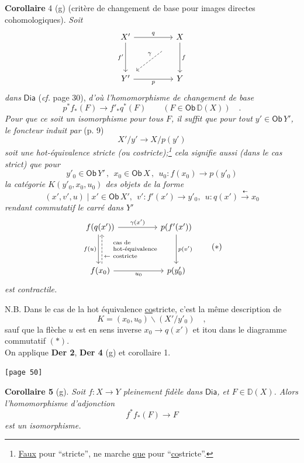 \documentclass[11pt]{article}
\newcommand{\printedpage}[1]{\marginpar{\footnotesize p.~#1}}
\newcommand{\msp}[1]{\marginpar{\footnotesize [#1]}}
\newcommand{\Ob}{\mathsf{Ob}}
\newcommand{\Dia}{\mathsf{Dia}}
\newcommand{\D}{\mathbb{D}}
\newcommand{\hot}{\mathsf{hot}}
\begin{document}
\noindent\textbf{Corollaire} 4 (g) (critère de changement de base pour images directes cohomologiques). \textit{Soit}
\[
\begin{tikzcd}[row sep=huge, column sep=huge]
X' \arrow[r, "q"] \arrow[d, "f'"'] & X \arrow[d, "f"] \arrow[dl, dashed, "\gamma"', shorten <=4ex, shorten >=1ex] \\
Y' \arrow[r, "p"'] & Y
\end{tikzcd}
\]
\textit{dans} $\Dia$ (\textit{cf.} page 30), \textit{d'où l'homomorphisme de changement de base}
\[ p^{*} f_{*}(F) \longrightarrow f'_{*} q^{*}(F) \qquad (F \in \Ob\,\D(X)) \quad . \]
\textit{Pour que ce soit un isomorphisme pour tous $F$, il suffit que pour tout $y' \in \Ob\,Y'$, le foncteur induit par} (p. 9)
\[ X'/y' \longrightarrow X/p(y') \]
\textit{soit une hot-équivalence stricte (ou costricte);\footnote[19]{\underline{Faux} pour “stricte”, ne marche \underline{que} pour “\underline{\underline{co}}stricte”.} cela signifie aussi (dans le cas strict) que pour}
\[ y'_{0} \in \Ob\,Y' \,,\ \ x_{0} \in \Ob\,X \,,\ \ u_{0} : f(x_{0}) \longrightarrow p(y'_{0}) \]
\textit{la catégorie $K(y'_{0}, x_{0}, u_{0})$ des objets de la forme}
\[ (x', v', u) \mid x' \in \Ob\,X',\ \ v' : f'(x') \to y'_{0},\ \ u : q(x') \overset{\dashleftarrow}{\longrightarrow} x_{0} \]
\textit{rendant commutatif le carré dans $Y'$}
\[
\begin{tikzcd}[row sep=huge, column sep=huge]
f(q(x')) \arrow[r, "\gamma(x')"] \arrow[d, shift right=0.5ex, "f(u)"'] & p(f'(x')) \arrow[d, "p(v')"] \\
f(x_{0}) \arrow[r, "u_{0}"'] \arrow[u, dashed, shift right=0.5ex, "\leftarrow\ \text{\scriptsize\shortstack[l]{cas de\\hot-équivalence\\costricte}}"'] & p(y'_{0})
\end{tikzcd}
\tag*{$(*)$}
\]
\textit{est contractile.}


\printedpage{28}

\noindent N.B. Dans le cas de la hot équivalence \underline{co}stricte, c'est la même description de
\[ K = (x_{0}, u_{0})\backslash(X'/y'_{0}) \quad , \]
sauf que la flèche $u$ est en sens inverse $x_{0} \to q(x')$ et itou dans le diagramme commutatif $(*)$.\\
On applique \textbf{Der 2}, \textbf{Der 4} (g) et corollaire 1.

\noindent\msp{page 50}\texttt{[page 50]}

\noindent\textbf{Corollaire 5} (g). \textit{Soit $f : X \to Y$ pleinement fidèle dans} $\Dia$\textit{, et $F \in \D(X)$. Alors l'homomorphisme d'adjonction}
\[ f^{*} f_{*}(F) \longrightarrow F \]
\textit{est un isomorphisme.}
\end{document}
